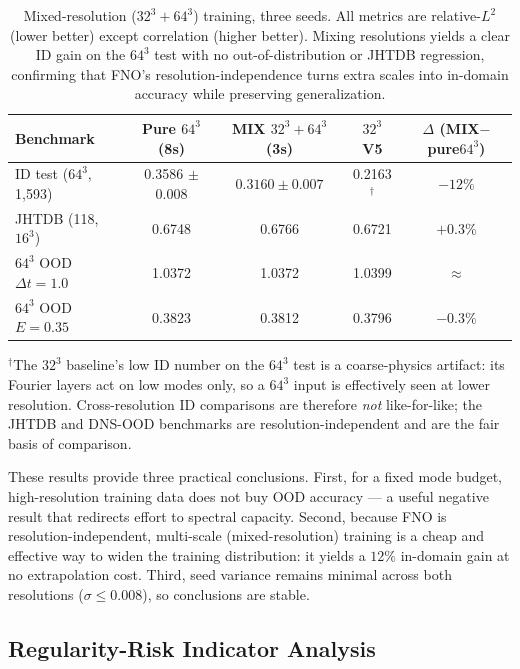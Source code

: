 \documentclass[review]{elsarticle}
\begin{document}
\begin{table}[t]
\centering
\caption{Mixed-resolution ($32^3{+}64^3$) training, three seeds. All metrics are relative-$L^2$
(lower better) except correlation (higher better). Mixing resolutions yields a clear ID gain on
the $64^3$ test with no out-of-distribution or JHTDB regression, confirming that FNO's
resolution-independence turns extra scales into in-domain accuracy while preserving
generalization.}
\label{tab:res-mix}
\begin{tabular}{lcccc}
\toprule
Benchmark & Pure $64^3$ (8s) & MIX $32^3{+}64^3$ (3s) & $32^3$ V5 & $\Delta$ (MIX$-$pure$64^3$) \\
\midrule
ID test ($64^3$, 1{,}593) & 0.3586 $\pm$ 0.008 & $\mathbf{0.3160 \pm 0.007}$ & 0.2163$^{\dagger}$ & $-12\%$ \\
JHTDB (118, $16^3$) & 0.6748 & 0.6766 & 0.6721 & $+0.3\%$ \\
$64^3$ OOD $\Delta t{=}1.0$ & 1.0372 & 1.0372 & 1.0399 & $\approx$ \\
$64^3$ OOD $E{=}0.35$ & 0.3823 & 0.3812 & 0.3796 & $-0.3\%$ \\
\bottomrule
\end{tabular}

\vspace{1em}
\raggedright\footnotesize
$^{\dagger}$The $32^3$ baseline's low ID number on the $64^3$ test is a coarse-physics artifact:
its Fourier layers act on low modes only, so a $64^3$ input is effectively seen at lower
resolution. Cross-resolution ID comparisons are therefore \emph{not} like-for-like; the JHTDB
and DNS-OOD benchmarks are resolution-independent and are the fair basis of comparison.
\end{table}

These results provide three practical conclusions. First, for a fixed mode budget,
high-resolution training data does not buy OOD accuracy --- a useful negative result that
redirects effort to spectral capacity. Second, because FNO is resolution-independent,
multi-scale (mixed-resolution) training is a cheap and effective way to widen the training
distribution: it yields a $12\%$ in-domain gain at no extrapolation cost. Third, seed variance
remains minimal across both resolutions ($\sigma \leq 0.008$), so conclusions are stable.

\subsection{Regularity-Risk Indicator Analysis}
\label{sec:singularity}
\end{document}
